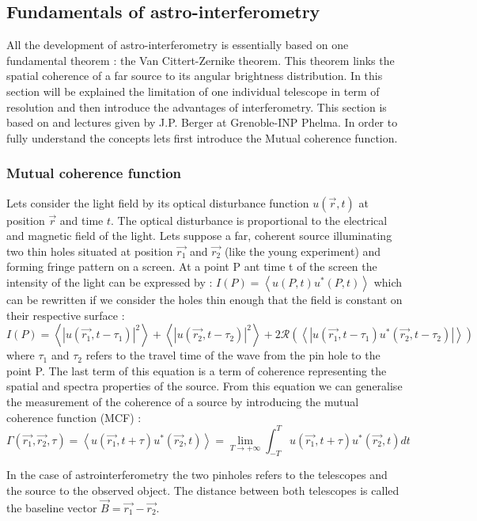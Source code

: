 \subsection{Fundamentals of astro-interferometry}
All the development of astro-interferometry is essentially based on one fundamental theorem : the Van Cittert-Zernike theorem. This theorem links the spatial coherence of a far source to its angular brightness distribution. In this section will be explained the limitation of one individual telescope in term of resolution and then introduce the advantages of interferometry. This section is based on \cite{Glindemann} and lectures given by J.P. Berger at Grenoble-INP Phelma. In order to fully understand the concepts lets first introduce the Mutual coherence function.

	\subsubsection{Mutual coherence function}
Lets consider the light field by its optical disturbance function $u(\vec{r},t)$ at position $\vec{r}$ and time $t$. The optical disturbance is proportional to the electrical and magnetic field of the light.
Lets suppose a far, coherent source illuminating two thin holes situated at position $\vec{r_1}$ and $\vec{r_2}$ (like the young experiment) and forming fringe pattern on a screen. At a point P ant time t of the screen the intensity of the light can be expressed by :
$I(P) = \left< u(P,t)u^*(P,t) \right>$ which can be rewritten if we consider the holes thin enough that the field is constant on their respective surface :
$$
I(P) = \left< \left| u(\vec{r_1},t-\tau_1) \right|^2 \right> + \left< \left| u(\vec{r_2},t-\tau_2) \right|^2 \right> +2\mathcal{R}\left( \left< \left| u(\vec{r_1},t-\tau_1)u^*(\vec{r_2},t-\tau_2) \right| \right> \right)
$$
where $\tau_1$ and $\tau_2$ refers to the travel time of the wave from the pin hole to the point P. The last term of this equation is a term of coherence representing the spatial and spectra properties of the source. From this equation we can generalise the measurement of the coherence of a source by introducing the mutual coherence function (MCF) :
\begin{equation}
\Gamma(\vec{r_1},\vec{r_2}, \tau) = \left< u(\vec{r_1},t+\tau)u^*(\vec{r_2},t)\right> = \lim\limits_{T\rightarrow +\infty}\int_{-T}^T u(\vec{r_1},t+\tau)u^*(\vec{r_2},t)dt
\end{equation} 

In the case of astrointerferometry the two pinholes refers to the telescopes and the source to the observed object. The distance between both telescopes is called the baseline vector $\vec{B}=\vec{r_1}-\vec{r_2}$. 

